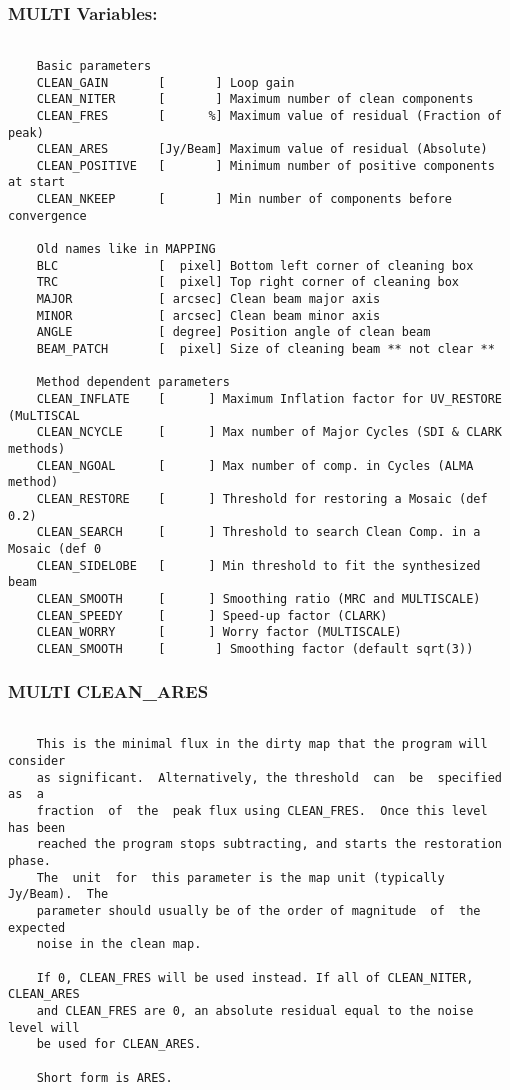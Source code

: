 \subsubsection{MULTI Variables:}
\begin{verbatim}

    Basic parameters
    CLEAN_GAIN       [       ] Loop gain
    CLEAN_NITER      [       ] Maximum number of clean components
    CLEAN_FRES       [      %] Maximum value of residual (Fraction of peak)
    CLEAN_ARES       [Jy/Beam] Maximum value of residual (Absolute)
    CLEAN_POSITIVE   [       ] Minimum number of positive components at start
    CLEAN_NKEEP      [       ] Min number of components before convergence

    Old names like in MAPPING
    BLC              [  pixel] Bottom left corner of cleaning box
    TRC              [  pixel] Top right corner of cleaning box
    MAJOR            [ arcsec] Clean beam major axis
    MINOR            [ arcsec] Clean beam minor axis
    ANGLE            [ degree] Position angle of clean beam
    BEAM_PATCH       [  pixel] Size of cleaning beam ** not clear **

    Method dependent parameters
    CLEAN_INFLATE    [      ] Maximum Inflation factor for UV_RESTORE (MuLTISCAL
    CLEAN_NCYCLE     [      ] Max number of Major Cycles (SDI & CLARK methods)
    CLEAN_NGOAL      [      ] Max number of comp. in Cycles (ALMA method)
    CLEAN_RESTORE    [      ] Threshold for restoring a Mosaic (def 0.2)
    CLEAN_SEARCH     [      ] Threshold to search Clean Comp. in a Mosaic (def 0
    CLEAN_SIDELOBE   [      ] Min threshold to fit the synthesized beam
    CLEAN_SMOOTH     [      ] Smoothing ratio (MRC and MULTISCALE)
    CLEAN_SPEEDY     [      ] Speed-up factor (CLARK)
    CLEAN_WORRY      [      ] Worry factor (MULTISCALE)
    CLEAN_SMOOTH     [       ] Smoothing factor (default sqrt(3))
\end{verbatim}
\subsubsection{MULTI CLEAN\_ARES}
\begin{verbatim}

    This is the minimal flux in the dirty map that the program will consider
    as significant.  Alternatively, the threshold  can  be  specified  as  a
    fraction  of  the  peak flux using CLEAN_FRES.  Once this level has been
    reached the program stops subtracting, and starts the restoration phase.
    The  unit  for  this parameter is the map unit (typically Jy/Beam).  The
    parameter should usually be of the order of magnitude  of  the  expected
    noise in the clean map.

    If 0, CLEAN_FRES will be used instead. If all of CLEAN_NITER, CLEAN_ARES
    and CLEAN_FRES are 0, an absolute residual equal to the noise level will
    be used for CLEAN_ARES.

    Short form is ARES.

\end{verbatim}
